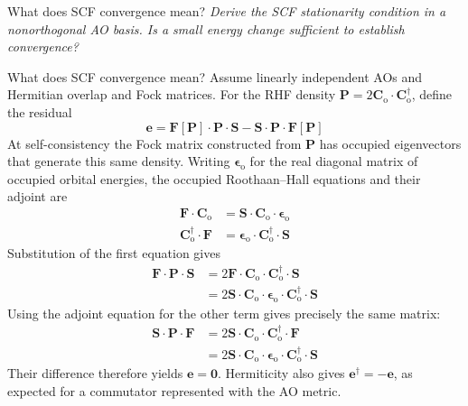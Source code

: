 \documentclass[11pt,a4paper,titlepage]{article}
\numberwithin{equation}{section}
\newcommand{\be}{\boldsymbol{e}}
\newcommand{\bC}{\boldsymbol{C}}
\newcommand{\bF}{\boldsymbol{F}}
\newcommand{\bO}{\boldsymbol{0}}
\newcommand{\bP}{\boldsymbol{P}}
\newcommand{\bS}{\boldsymbol{S}}
\newcommand{\beps}{\boldsymbol{\epsilon}}
\newcommand{\violet}[1]{\textcolor{hfViolet}{#1}}
\begin{document}
\begin{hfexercise}[phantom={\label{ex:scf-convergence}}]{What does SCF convergence mean?}
\violet{\textit{Derive the SCF stationarity condition in a nonorthogonal AO
basis. Is a small energy change sufficient to establish convergence?}}
\end{hfexercise}
\begin{hfsolution}{What does SCF convergence mean?}
Assume linearly independent AOs and Hermitian overlap and Fock matrices.
For the RHF density $\bP=2\bC_\text{o}\cdot\bC_\text{o}^\dag$, define
the residual
\begin{equation}
  \be=\bF[\bP]\cdot\bP\cdot\bS
  -\bS\cdot\bP\cdot\bF[\bP]
\end{equation}
At self-consistency the Fock matrix constructed from $\bP$ has occupied
eigenvectors that generate this same density. Writing $\beps_\text{o}$ for
the real diagonal matrix of occupied orbital energies, the occupied
Roothaan--Hall equations and their adjoint are
\begin{align}
  \bF\cdot\bC_\text{o}
  &=\bS\cdot\bC_\text{o}\cdot\beps_\text{o}\\
  \bC_\text{o}^\dag\cdot\bF
  &=\beps_\text{o}\cdot\bC_\text{o}^\dag\cdot\bS
\end{align}
Substitution of the first equation gives
\begin{equation}
\begin{split}
  \bF\cdot\bP\cdot\bS
  &=2\bF\cdot\bC_\text{o}\cdot\bC_\text{o}^\dag\cdot\bS\\
  &=2\bS\cdot\bC_\text{o}\cdot\beps_\text{o}
    \cdot\bC_\text{o}^\dag\cdot\bS
\end{split}
\end{equation}
Using the adjoint equation for the other term gives precisely the same
matrix:
\begin{equation}
\begin{split}
  \bS\cdot\bP\cdot\bF
  &=2\bS\cdot\bC_\text{o}\cdot\bC_\text{o}^\dag\cdot\bF\\
  &=2\bS\cdot\bC_\text{o}\cdot\beps_\text{o}
    \cdot\bC_\text{o}^\dag\cdot\bS
\end{split}
\end{equation}
Their difference therefore yields $\be=\bO$. Hermiticity also gives
$\be^\dag=-\be$, as expected for a commutator represented with the AO
metric.


\end{hfsolution}
\end{document}
